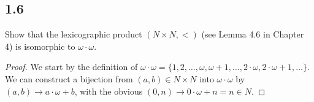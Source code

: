 \subsection*{1.6} Show that the lexicographic product $(N \times N, <)$ (see Lemma 4.6 in Chapter 4) is isomorphic to $\omega \cdot \omega$.

\begin{proof}
        We start by the definition of $\omega \cdot \omega = \{1, 2, \dots, \omega, \omega+1, \dots, 2\cdot \omega, 2\cdot \omega + 1, \dots \}$. We can construct a bijection from $(a,b) \in N \times N$ into $\omega \cdot \omega$ by $(a,b) \rightarrow a \cdot \omega + b$, with the obvious $(0, n) \rightarrow 0 \cdot \omega + n = n \in N$. 
\end{proof}

